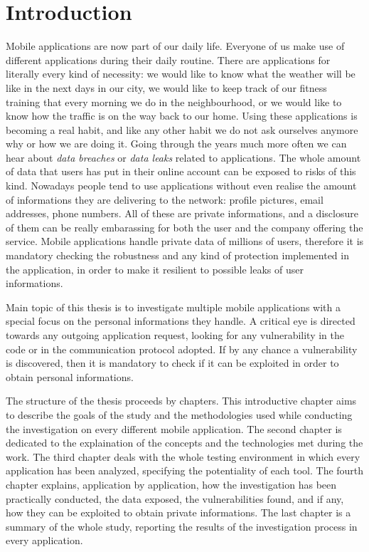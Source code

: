 \chapter{Introduction}
	
	\par Mobile applications are now part of our daily life. Everyone of us make use of different applications during their daily routine. There are applications for literally every kind of necessity: we would like to know what the weather will be like in the next days in our city, we would like to keep track of our fitness training that every morning we do in the neighbourhood, or we would like to know how the traffic is on the way back to our home. Using these applications is becoming a real habit, and like any other habit we do not ask ourselves anymore why or how we are doing it. Going through the years much more often we can hear about \textit{data breaches} or \textit{data leaks} related to applications. The whole amount of data that users has put in their online account can be exposed to risks of this kind. Nowadays people tend to use applications without even realise the amount of informations they are delivering to the network: profile pictures, email addresses, phone numbers. All of these are private informations, and a disclosure of them can be really embarassing for both the user and the company offering the service. \newline
	Mobile applications handle private data of millions of users, therefore it is mandatory checking the robustness and any kind of protection implemented in the application, in order to make it resilient to possible leaks of user informations.\newline
	\par Main topic of this thesis is to investigate multiple mobile applications with a special focus on the personal informations they handle. A critical eye is directed towards any outgoing application request, looking for any vulnerability in the code or in the communication protocol adopted. If by any chance a vulnerability is discovered, then it is mandatory to check if it can be exploited in order to obtain personal informations. \newline
	\par The structure of the thesis proceeds by chapters. This introductive chapter aims to describe the goals of the study and the methodologies used while conducting the investigation on every different mobile application. The second chapter is dedicated to the explaination of the concepts and the technologies met during the work. The third chapter deals with the whole testing environment in which every application has been analyzed, specifying the potentiality of each tool. The fourth chapter explains, application by application, how the investigation has been practically conducted, the data exposed, the vulnerabilities found, and if any, how they can be exploited to obtain private informations. The last chapter is a summary of the whole study, reporting the results of the investigation process in every application.
	
